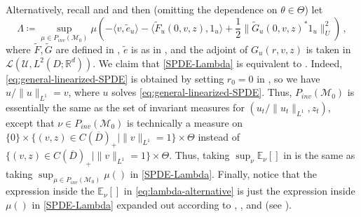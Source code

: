 \documentclass[final]{amsart}
\numberwithin{thm}{section}
\numberwithin{equation}{section}
\newcommand{\E}{\mathbb{E}}
\newcommand{\U}{\mathcal{U}}
\newcommand{\mcM}{\mathcal{M}}
\newcommand{\R}{\mathbb{R}}
\newcommand{\Ll}{\mathcal{L}}
\newcommand{\ip}[2]{\langle #1, #2 \rangle}
\newcommand{\cdom}{C(\overline D)_+}
\begin{document}
Alternatively, recall  and  and then (omitting the dependence on $\theta \in \Theta$) let 
\begin{equation}\label{SPDE-Lambda}
    \Lambda \coloneqq \sup_{\mu \in P_{inv}(\mcM_0)} \mu (-\ip{v}{\tilde e_u} - \ip{\tilde F_u(0,v,z)}{1_u} + \frac{1}{2}\|\tilde G_u(0,v,z)^*1_u\|_U^2 ) \,,
\end{equation}
where $\tilde F,\tilde G$ are defined in , $\tilde e$ is as in , and the adjoint of $G_u(r,v,z)$ is taken in $\Ll(\U,L^2(D;\R^d))$. We claim that \eqref{SPDE-Lambda} is equivalent to . Indeed, \eqref{eq:general-linearized-SPDE} is obtained by setting $r_0 = 0$ in , so we have $u/\|u\|_{L^1} = v$, where $u$ solves \eqref{eq:general-linearized-SPDE}. Thus, $P_{inv}(\mcM_0)$ is essentially the same as the set of invariant measures for $(u_t/\|u_t\|_{L^1},z_t)$, except that $\nu \in P_{inv}(\mcM_0)$ is technically a measure on $\{0\} \times \{(v,z) \in \cdom \mid \|v\|_{L^1} = 1\} \times \Theta$ instead of $\{(v,z) \in \cdom \mid \|v\|_{L^1} = 1\} \times \Theta$. Thus, taking $\sup_\nu \E_\nu[]$ in  is the same as taking $\sup_{\mu \in P_{inv}(\mcM_0)} \mu()$ in \eqref{SPDE-Lambda}. Finally, notice that the expression inside the $\E_\nu[]$ in \eqref{eq:lambda-alternative} is just the expression inside $\mu()$ in \eqref{SPDE-Lambda} expanded out according to , , and  (see ).
\end{document}
